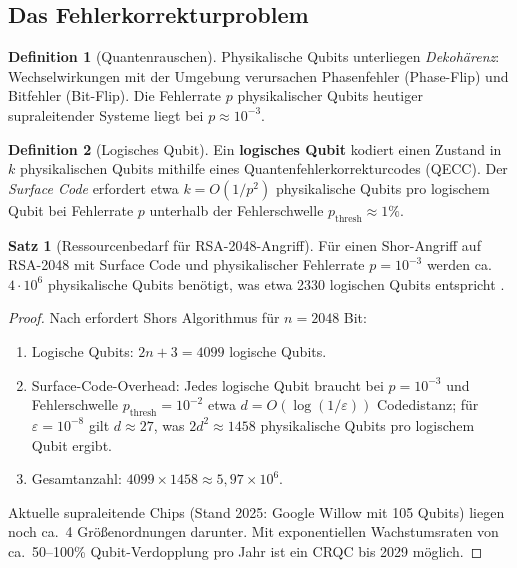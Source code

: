 ﻿\documentclass[a4paper,12pt]{article}
\theoremstyle{definition}
\newtheorem{definition}{Definition}[section]
\newtheorem{satz}{Satz}[section]
\begin{document}
\subsection{Das Fehlerkorrekturproblem}

\begin{definition}[Quantenrauschen]
Physikalische Qubits unterliegen \emph{Dekohärenz}: Wechselwirkungen mit der
Umgebung verursachen Phasenfehler (Phase-Flip) und Bitfehler (Bit-Flip).
Die Fehlerrate $p$ physikalischer Qubits heutiger supraleitender Systeme
liegt bei $p \approx 10^{-3}$.
\end{definition}

\begin{definition}[Logisches Qubit]
Ein \textbf{logisches Qubit} kodiert einen Zustand in $k$ physikalischen Qubits
mithilfe eines Quantenfehlerkorrekturcodes (QECC). Der \emph{Surface Code} \cite{FC09}
erfordert etwa $k = O(1/p^2)$ physikalische Qubits pro logischem Qubit
bei Fehlerrate $p$ unterhalb der Fehlerschwelle $p_\mathrm{thresh} \approx 1\%$.
\end{definition}

\begin{satz}[Ressourcenbedarf für RSA-2048-Angriff]
\label{satz:ressource}
Für einen Shor-Angriff auf RSA-2048 mit Surface Code und physikalischer Fehlerrate
$p = 10^{-3}$ werden ca.\ $4 \cdot 10^6$ physikalische Qubits benötigt,
was etwa 2330 logischen Qubits entspricht \cite{GE21}.
\end{satz}

\begin{proof}
Nach \cite{GE21} erfordert Shors Algorithmus für $n = 2048$ Bit:
\begin{enumerate}
\item Logische Qubits: $2n + 3 = 4099$ logische Qubits.
\item Surface-Code-Overhead: Jedes logische Qubit braucht bei $p = 10^{-3}$
  und Fehlerschwelle $p_\mathrm{thresh} = 10^{-2}$ etwa $d = O(\log(1/\varepsilon))$
  Codedistanz; für $\varepsilon = 10^{-8}$ gilt $d \approx 27$, was
  $2d^2 \approx 1458$ physikalische Qubits pro logischem Qubit ergibt.
\item Gesamtanzahl: $4099 \times 1458 \approx 5{,}97 \times 10^6$.
\end{enumerate}
Aktuelle supraleitende Chips (Stand 2025: Google Willow mit 105 Qubits)
liegen noch ca.\ 4 Größenordnungen darunter. Mit exponentiellen Wachstumsraten
von ca.\ 50--100\% Qubit-Verdopplung pro Jahr ist ein CRQC bis 2029 möglich.
\end{proof}
\end{document}
